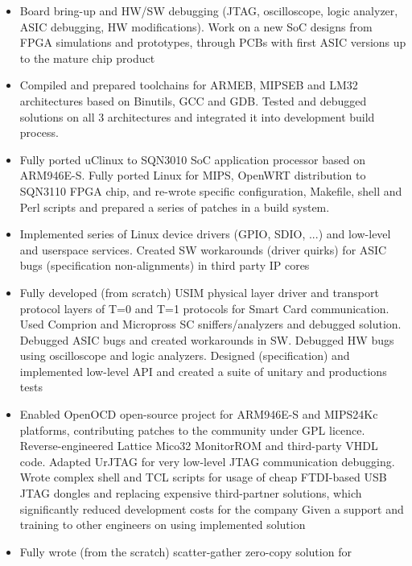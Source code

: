 \documentclass[a4paper, oneside, final]{scrartcl}
\begin{document}
\begin{itemize}
   \item Board bring-up and HW/SW debugging (JTAG, oscilloscope,
         logic analyzer, ASIC debugging, HW modifications). Work on a new SoC
         designs from FPGA simulations and prototypes, through PCBs with first ASIC versions up
         to the mature chip product
   \item Compiled and prepared toolchains for ARMEB, MIPSEB and LM32
            architectures based on Binutils, GCC and GDB.
            Tested and debugged solutions on all 3 architectures and integrated
            it into development build process.
   \item Fully ported uClinux to SQN3010 SoC application processor based on
            ARM946E-S. Fully ported Linux for MIPS, OpenWRT distribution to SQN3110 FPGA
            chip, and re-wrote specific configuration, Makefile, shell and Perl scripts
            and prepared a series of patches in a build system.
   \item Implemented series of Linux device drivers (GPIO, SDIO, ...) and
            low-level and userspace services. Created SW workarounds (driver
            quirks) for ASIC bugs (specification non-alignments) in third party
            IP cores
   \item Fully developed (from scratch) USIM physical layer driver and
            transport protocol layers of T=0 and T=1 protocols for Smart Card
            communication. Used Comprion and Micropross SC sniffers/analyzers
            and debugged solution. Debugged ASIC bugs and created workarounds
            in SW. Debugged HW bugs using oscilloscope and logic analyzers. 
            Designed (specification) and implemented low-level API and 
            created a suite of unitary and productions tests
   \item Enabled OpenOCD open-source project for ARM946E-S and MIPS24Kc
            platforms, contributing patches to the community under GPL
            licence. Reverse-engineered Lattice Mico32 MonitorROM and third-party VHDL code.
            Adapted UrJTAG for very low-level JTAG communication debugging.
            Wrote complex shell and TCL scripts for usage of cheap
            FTDI-based USB JTAG dongles and replacing expensive third-partner solutions,
            which significantly reduced development costs for the company
            Given a support and training to other engineers on using
            implemented solution
   \item Fully wrote (from the scratch) scatter-gather zero-copy solution for

\end{itemize}
\end{document}

